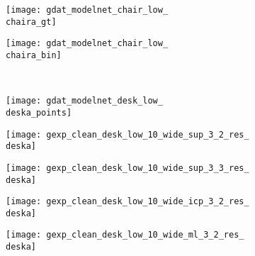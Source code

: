\begin{figure*}[t]
{\begin{subfigure}[t]{1\textwidth}
\begin{subfigure}[t]{0.095\textwidth}
   			\texttt{[image: gdat\_modelnet\_chair\_low\_\\chaira\_gt]}
   		\end{subfigure}
   		\begin{subfigure}[t]{0.095\textwidth}
   			\vspace{0px}\centering
   			\texttt{[image: gdat\_modelnet\_chair\_low\_\\chaira\_bin]}
   		\end{subfigure}
   		\\[2px]
   		\begin{subfigure}[t]{0.095\textwidth}
   			\vspace{0px}\centering
   			\texttt{[image: gdat\_modelnet\_desk\_low\_\\deska\_points]}
   		\end{subfigure}
   		\begin{subfigure}[t]{0.095\textwidth}
   			\vspace{0px}\centering
   			\texttt{[image: gexp\_clean\_desk\_low\_10\_wide\_sup\_3\_2\_res\_\\deska]}
   		\end{subfigure}
   		\begin{subfigure}[t]{0.095\textwidth}
   			\vspace{0px}\centering
   			\texttt{[image: gexp\_clean\_desk\_low\_10\_wide\_sup\_3\_3\_res\_\\deska]}
   		\end{subfigure}
   		\begin{subfigure}[t]{0.095\textwidth}
   			\vspace{0px}\centering
   			\texttt{[image: gexp\_clean\_desk\_low\_10\_wide\_icp\_3\_2\_res\_\\deska]}
   		\end{subfigure}
        \begin{subfigure}[t]{0.095\textwidth}
            \vspace{0px}\centering
            \texttt{[image: gexp\_clean\_desk\_low\_10\_wide\_ml\_3\_2\_res\_\\deska]}

\end{subfigure}
\end{subfigure}}
\end{figure*}

